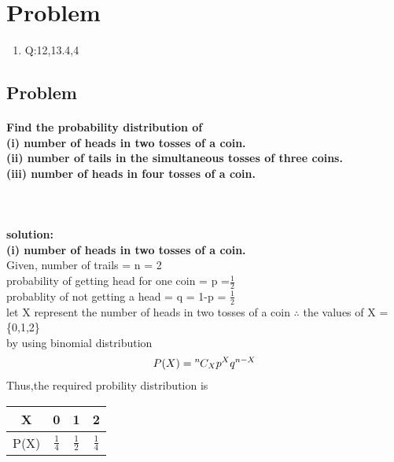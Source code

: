 \documentclass[10pt, a4paper]{article}
\title{\mytitle}
\author{\myauthor\hspace{1em}\\\contact\\FWC22088\hspace{6.5em}IITH\hspace{0.5em}\mymodule\hspace{6em}probability}
\newcommand*{\permcomb}[4][0mu]{{{}^{#3}\mkern#1#2_{#4}}}
\newcommand*{\comb}[1][-1mu]{\permcomb[#1]{C}}
\begin{document}
	\maketitle
\section{Problem}
\begin{enumerate}
\item Q:12,13.4,4
\end{enumerate}
\subsection{Problem}
\paragraph{Find the probability distribution of\\
(i) number of heads in two tosses of a coin.\\
(ii) number of tails in the simultaneous tosses of three coins.\\
(iii) number of heads in four tosses of a coin.\\\\\\}
\textbf{solution:}\\
\textbf{(i) number of heads in two tosses of a coin.}\\
Given, number of trails = n = 2\\
probability of getting head for one coin = p =$\frac{1}{2}$\\
probablity of not getting a head = q = 1-p = $\frac{1}{2}$\\
let X represent the number of heads in two tosses of a coin
$\therefore$ the values of X = \{0,1,2\} \\
 by using binomial distribution\\
 \begin{align*}
 P(X) = \comb{n}{X}p^Xq^{n-X}
 \end{align*}
Thus,the required probility distribution is\\
\begin{center}
\begin{tabular}{ |c|c|c|c| }
\hline
X & 0 & 1 & 2 \\
\hline
P(X) & $\frac{1}{4}$ & $\frac{1}{2}$ & $\frac{1}{4}$\\
\hline
\end{tabular}\\
\vspace{2mm}
\end{center}
\end{document}

